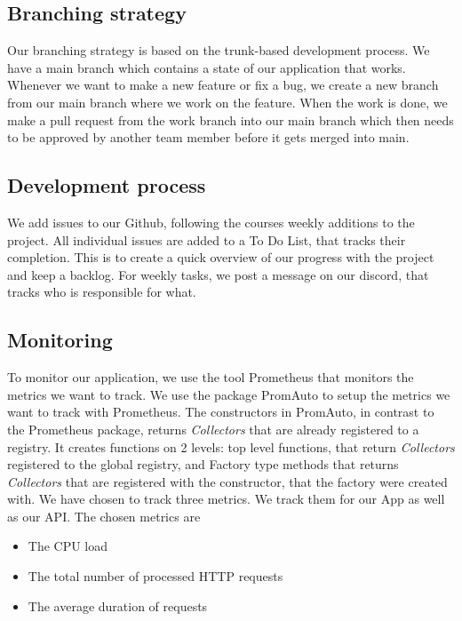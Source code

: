 \subsection{Branching strategy}
Our branching strategy is based on the trunk-based development process.
We have a main branch which contains a state of our application that works. Whenever we want to make a new feature or fix a bug, we create a new branch from our main branch where we work on the feature. When the work is done, we make a pull request from the work branch into our main branch which then needs to be approved by another team member before it gets merged into main.

\subsection{Development process}
We add issues to our Github, following the courses weekly additions to the project. All individual issues are added to a To Do List, that tracks their completion. This is to create a quick overview of our progress with the project and keep a backlog.
For weekly tasks, we post a message on our discord, that tracks who is responsible for what.


\subsection{Monitoring}\label{Monitoring}

To monitor our application, we use the tool Prometheus that monitors the metrics we want to track. 
We use the package PromAuto to setup the metrics we want to track with Prometheus. The constructors in PromAuto, in contrast to the Prometheus package, returns \textit{Collectors} that are already registered to a registry. It creates functions on 2 levels: top level functions, that return \textit{Collectors} registered to the global registry, and Factory type methods that returns \textit{Collectors} that are registered with the constructor, that the factory were created with.
\newline
We have chosen to track three metrics. We track them for our App as well as our API. The chosen metrics are
\begin{itemize}
    \item The CPU load
    \item The total number of processed HTTP requests
    \item The average duration of requests
\end{itemize}

